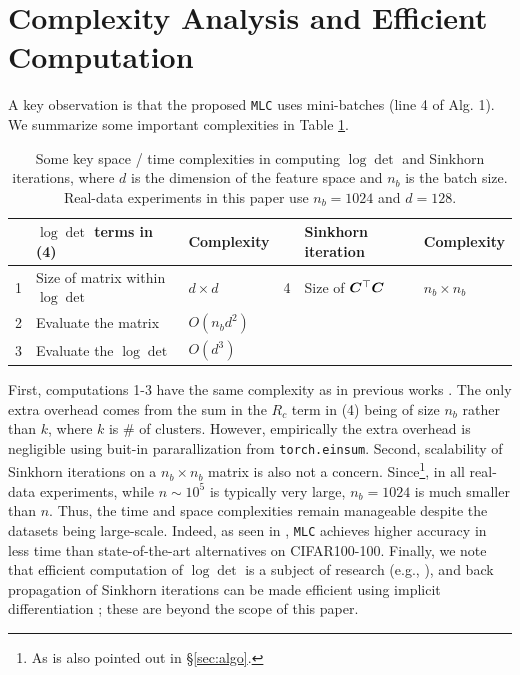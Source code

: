 \documentclass[10pt,twocolumn,letterpaper]{article}
\newcommand{\ours}{MLC}
\newcommand{\mours}{\texttt{\ours}}
\begin{document}
   \section{Complexity Analysis and Efficient Computation}
   A key observation is that the proposed \mours{} uses mini-batches (line 4 of Alg. 1). We summarize some important complexities in Table \ref{tab:my-table}.
\begin{table}[H]
    \centering
    \caption{Some key space / time complexities in computing $\log\det$ and Sinkhorn iterations, where $d$ is the dimension of the feature space and $n_b$ is the batch size. Real-data experiments in this paper use $n_b=1024$ and $d=128$.}
    \label{tab:my-table}
    \vspace{-0.2cm}
    \begin{tabular}{@{}llllll@{}}
    \toprule
      & $\log\det$ terms in (4) & Complexity   &  & Sinkhorn iteration & Complexity \\ \midrule
    1 & Size of matrix within $\log\det$ & $d\times d$ & 4 & Size of ${\bm{C}}^\top {\bm{C}}$ & $n_b\times n_b$ \\
    2 & Evaluate the matrix     & $O(n_b d^2)$ &  &                    &            \\
    3 & Evaluate the $\log\det$ & $O(d^3)$     &  &                    &            \\ \bottomrule
    \end{tabular}%
\end{table}
\noindent First, computations 1-3 have the same complexity as in previous works \cite{yu2020learning, Li2022-vq}. The only extra overhead comes from the sum in the $R_c$ term in (4) being of size $n_b$ rather than $k$, where $k$ is \# of clusters. However, empirically the extra overhead is negligible using buit-in pararallization from \texttt{torch.einsum}. Second, scalability of Sinkhorn iterations on a $n_b\times n_b$ matrix is also not a concern. Since\footnote{As is also pointed out in \S \ref{sec:algo}.}, in all real-data experiments, while $n\sim 10^5$ is typically very large, $n_b=1024$ is much smaller than $n$. Thus, the time and space complexities remain manageable despite the datasets being large-scale.
Indeed, as seen in , \mours{} achieves higher accuracy in less time than state-of-the-art alternatives on CIFAR100-100. Finally, we note that
efficient computation of $\log\det$ is a subject of research (e.g., \cite{Baek2022-bj}), and back propagation of Sinkhorn iterations can be made efficient using implicit differentiation \cite{Eisenberger2022-oo}; these are beyond the scope of this paper.
   
\end{document}
